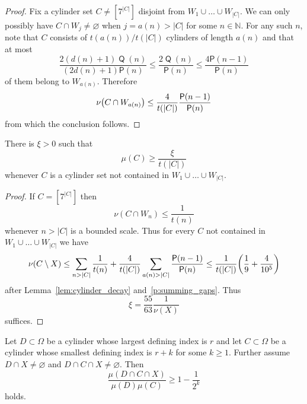 \documentclass[AHL,Unicode,longabstracts,published]{cedram}
\DeclareMathOperator{\Q}{\mathsf{Q}}
\newcommand{\N}{\mathbb{N}}
\renewcommand{\P}{\mathsf{P}}
\renewcommand{\emptyset}{\varnothing}
\let\originalleft\left
\let\originalright\right
\renewcommand{\left}{\mathopen{}\mathclose\bgroup\originalleft}
\renewcommand{\right}{\aftergroup\egroup\originalright}
\begin{document}
\pagebreak{}
\begin{proof}
Fix a cylinder set $C \ne [7^{|C|}]$ disjoint from $W_1 \cup \dots \cup W_{|C|}$. We can only possibly have $C \cap W_j \ne \emptyset$ when $j = a(n) > |C|$ for some $n \in \N$. For any such $n$, note that $C$ consists of $t(a(n)) / t(|C|)$ cylinders of length $a(n)$ and that at most
\[
\frac{2 (d(n) + 1) \Q(n)}{(2d(n)+1) \P(n)}
\le
\frac{2 \Q(n)}{\P(n)}
\le
\frac{4 \P(n-1)}{\P(n)}
\]
of them belong to $W_{a(n)}$. Therefore
\[
\nu\left(C \cap W_{a(n)}\right) \le \frac{4}{t(|C|)} \frac{\P(n-1)}{\P(n)}
\]
from which the conclusion follows.
\end{proof}


\begin{lemm}\label{lem:cylinder_size}
There is $\xi > 0$ such that
\[
\mu(C) \ge \frac{\xi}{t(|C|)}
\]
whenever $C$ is a cylinder set not contained in $W_1 \cup \dots \cup W_{|C|}$.
\end{lemm}
\begin{proof}
If $C = [7^{|C|}]$ then
\[
\nu(C \cap W_n) \le \frac{1}{t(n)}
\]
whenever $n > |C|$ is a bounded scale. Thus for every $C$ not contained in $W_1 \cup \dots \cup W_{|C|}$ we have
\[
\nu(C \setminus X)
\le
\sum_{n > |C|} \frac{1}{t(n)} + \frac{4}{t(|C|)} \sum_{a(n) > |C|} \frac{\P(n-1)}{\P(n)}
\le
\frac{1}{t(|C|)} \left(\frac{1}{9} + \frac{4}{10^5} \right)
\]
after Lemma~\ref{lem:cylinder_decay} and~\ref{p:summing_gaps}. Thus
\[
\xi = \frac{55}{63} \frac{1}{\nu(X)}
\]
suffices.
\end{proof}

\begin{lemm}\label{lem:indep}
Let $D \subset \Omega$ be a cylinder whose largest defining index is $r$ and let $C \subset \Omega$ be a cylinder whose smallest defining index is $r+k$ for some $k \ge 1$. Further assume $D \cap X \neq \emptyset$ and $D \cap C \cap X \neq \emptyset$. Then
\[
\frac{\mu(D\cap C \cap X)}{\mu(D)\mu(C)}\geq 1-\frac{1}{2^k}
\]
holds.
\end{lemm}
\end{document}
